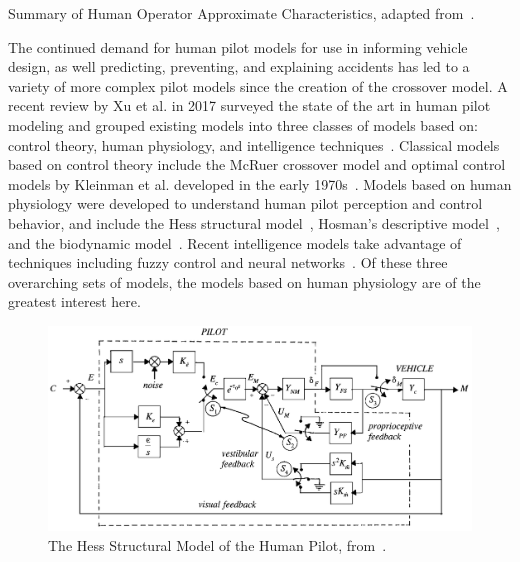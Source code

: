 \begin{table}[tb]
    \centering
    \caption[Summary of Human Operator Approximate Characteristics]{Summary of Human Operator Approximate Characteristics, adapted from~\citet{mcruer_mathematical_1974}.}
    \label{table:mcruer1974b}
\end{table}

The continued demand for human pilot models for use in informing vehicle design, as well predicting, preventing, and explaining accidents has led to a variety of more complex pilot models since the creation of the crossover model.
A recent review by Xu et al. in 2017 surveyed the state of the art in human pilot modeling and grouped existing models into three classes of models based on: control theory, human physiology, and intelligence techniques~\citep{xu_review_2017}.
Classical models based on control theory include the McRuer crossover model and optimal control models by Kleinman et al. developed in the early 1970s~\citep{kleinman_optimal_1970, baron_optimal_1970}.
Models based on human physiology were developed to understand human pilot perception and control behavior, and include the Hess structural model~\citep{hess_structural_1980, hess_model_1990, hess_unified_1997}, Hosman's descriptive model~\citep{hosman_pilots_nodate, hosman_pilots_1999}, and the biodynamic model~\citep{griffin_validation_2001}.
Recent intelligence models take advantage of techniques including fuzzy control and neural networks~\citep{zaychik_conspectus_2006, gestwa_modelling_2003}.
Of these three overarching sets of models, the models based on human physiology are of the greatest interest here.

\begin{figure}[tb!]
    \begin{center}
        \includegraphics[width=0.8\linewidth]{figures/Introduction/Screen_Shot_2018-07-31_at_11_21_44_AM.png}
        \caption[The Hess Structural Model of the Human Pilot]{The Hess Structural Model of the Human Pilot, from~\citet{hess_unified_1997}.}
        \label{figure:structuralmodel}
    \end{center}
\end{figure}


